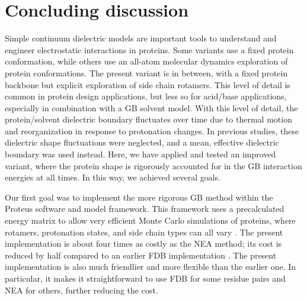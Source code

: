 \documentclass[a4paper,12pt]{article}
\begin{document}
\section{Concluding discussion}
Simple continuum dielectric models are important tools to understand and engineer electrostatic interactions in proteins.
Some variants use a fixed protein conformation, while others use an all-atom molecular dynamics exploration of protein
conformations. The present variant is in between, with a fixed protein backbone but explicit exploration of side chain
rotamers. This level of detail is common in protein design applications, but less so for acid/base applications, especially
in combination with a GB solvent model. With this level of detail, the protein/solvent dielectric boundary fluctuates over
time due to thermal motion and reorganization in response to protonation changes. In previous studies, these dielectric
shape fluctuations were neglected, and a mean, effective dielectric boundary was used instead. Here, we have applied and
tested an improved variant, where the protein shape is rigorously accounted for in the GB interaction energies at all times.
In this way, we achieved several goals.

Our first goal was to implement the more rigorous GB method within the Proteus software and model framework. This framework
uses a precalculated energy matrix to allow very efficient Monte Carlo simulations of proteins, where rotamers, protonation
states, and side chain types can all vary \cite{Simonson13,Mignon16}. The present implementation is about four times as costly
as the NEA method; its cost is reduced by half compared to an earlier FDB implementation \cite{Aleksandrov10b}. The present
implementation is also much friendlier and more flexible than the earlier one. In particular, it makes it straightforward to
use FDB for some residue pairs  and NEA for others, further reducing the cost.
\end{document}
